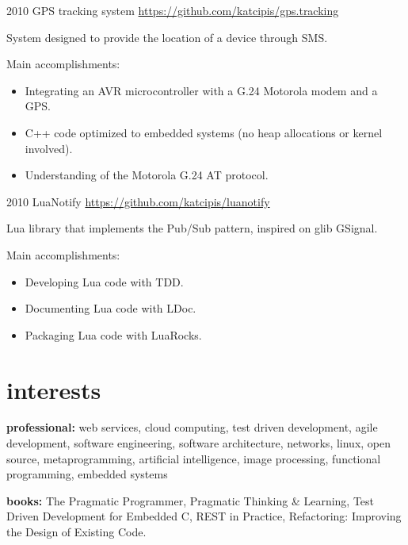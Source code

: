 \documentclass[]{friggeri-cv} %
\begin{document}
\begin{entrylist}
\entry
{2010}
{GPS tracking system}
{\href{https://github.com/katcipis/gps.tracking}{https://github.com/katcipis/gps.tracking}}
{

System designed to provide the location of a device through SMS. 

Main accomplishments:\\
\begin{itemize}
\item Integrating an AVR microcontroller with a G.24 Motorola modem and a GPS.
\item C++ code optimized to embedded systems (no heap allocations or kernel involved).
\item Understanding of the Motorola G.24 AT protocol.
\end{itemize}
}
\end{entrylist}

\begin{entrylist}
\entry
{2010}
{LuaNotify}
{\href{https://github.com/katcipis/luanotify}{https://github.com/katcipis/luanotify}}
{

Lua library that implements the Pub/Sub pattern, inspired on glib GSignal.

Main accomplishments:\\
\begin{itemize}
\item Developing Lua code with TDD.
\item Documenting Lua code with LDoc.
\item Packaging Lua code with LuaRocks.
\end{itemize}
}
\end{entrylist}


\section{interests}

\textbf{professional:} web services, cloud computing, test driven development, agile development, software engineering, software architecture, networks, linux, open source, metaprogramming, artificial intelligence, image processing, functional programming, embedded systems

\textbf{books:} The Pragmatic Programmer, Pragmatic Thinking \& Learning, Test Driven Development for Embedded C, REST in Practice, Refactoring: Improving the Design of Existing Code.
\end{document}
